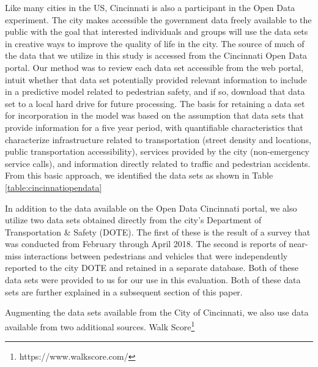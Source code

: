 \documentclass{llncs}
\begin{document}
Like many cities in the US, Cincinnati is also a participant in the Open Data experiment. The city makes accessible the government data freely available to the public with the goal that interested individuals and groups will use the data sets in creative ways to improve the quality of life in the city. The source of much of the data that we utilize in this study is accessed from the Cincinnati Open Data portal. Our method was to review each data set accessible from the web portal, intuit whether that data set potentially provided relevant information to include in a predictive model related to pedestrian safety, and if so, download that data set to a local hard drive for future processing. The basis for retaining a data set for incorporation in the model was based on the assumption that data sets that provide information for a five year period, with quantifiable characteristics that characterize infrastructure related to transportation (street density and locations, public transportation accessibility), services provided by the city (non-emergency service calls), and information directly related to traffic and pedestrian accidents. From this basic approach, we identified the data sets as shown in Table \ref{table:cincinnatiopendata}

In addition to the data available on the Open Data Cincinnati portal, we also utilize two data sets obtained directly from the city's Department of Transportation \& Safety (DOTE). The first of these is the result of a survey that was conducted from February through April 2018. The second is reports of near-miss interactions between pedestrians and vehicles that were independently reported to the city DOTE and retained in a separate database. Both of these data sets were provided to us for our use in this evaluation. Both of these data sets are further explained in a subsequent section of this paper.

Augmenting the data sets available from the City of Cincinnati, we also use data available from two additional sources. Walk Score\textsuperscript{\tiny\textregistered}\footnote{https://www.walkscore.com/}
\end{document}
